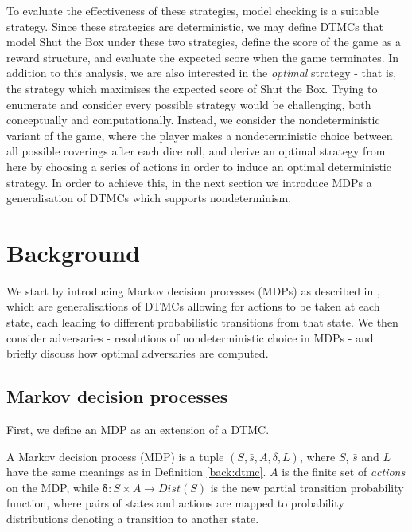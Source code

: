 To evaluate the effectiveness of these strategies, model checking is a suitable strategy. Since these strategies are deterministic, we may define DTMCs that model Shut the Box under these two strategies, define the score of the game as a reward structure, and evaluate the expected score when the game terminates. In addition to this analysis, we are also interested in the \emph{optimal} strategy - that is, the strategy which maximises the expected score of Shut the Box. Trying to enumerate and consider every possible strategy would be challenging, both conceptually and computationally. Instead, we consider the nondeterministic variant of the game, where the player makes a nondeterministic choice between all possible coverings after each dice roll, and derive an optimal strategy from here by choosing a series of actions in order to induce an optimal deterministic strategy. In order to achieve this, in the next section we introduce MDPs a generalisation of DTMCs which supports nondeterminism.

\section{Background}
\label{cs1:stb_background}

We start by introducing Markov decision processes (MDPs) as described in \cite{forejt_automated_2011}, which are generalisations of DTMCs allowing for actions to be taken at each state, each leading to different probabilistic transitions from that state. We then consider adversaries - resolutions of nondeterministic choice in MDPs - and briefly discuss how optimal adversaries are computed.

\subsection{Markov decision processes}
\label{cs1:mdps}
First, we define an MDP as an extension of a DTMC.

\begin{definition}
\label{cs1:def_mdps}

A Markov decision process (MDP) is a tuple $(S, \bar{s}, A, \delta, L)$, where $S$, $\bar{s}$ and $L$ have the same meanings as in Definition \ref{back:dtmc}. $A$ is the finite set of \emph{actions} on the MDP, while  $\mathbf{\delta} : S \times A \rightarrow Dist(S)$ is the new partial transition probability function, where pairs of states and actions are mapped to probability distributions denoting a transition to another state.

\end{definition}

